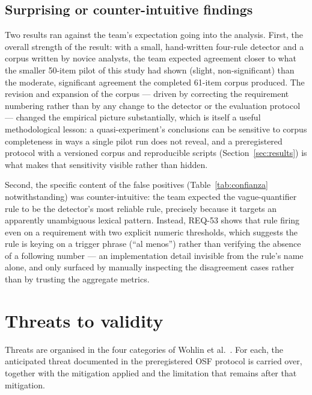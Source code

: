\documentclass[pdflatex,sn-mathphys-num]{sn-jnl}
\theoremstyle{thmstyleone}%
\theoremstyle{thmstyletwo}%
\theoremstyle{thmstylethree}%
\begin{document}
	\subsection{Surprising or counter-intuitive findings}\label{subsec:disc-surprising}
	
	Two results ran against the team's expectation going into the analysis. First,
	the overall strength of the result: with a small, hand-written four-rule
	detector and a corpus written by novice analysts, the team expected agreement
	closer to what the smaller 50-item pilot of this study had shown (slight,
	non-significant) than the moderate, significant agreement the completed
	61-item corpus produced. The revision and expansion of the corpus --- driven by
	correcting the requirement numbering rather than by any change to the detector
	or the evaluation protocol --- changed the empirical picture substantially,
	which is itself a useful methodological lesson: a quasi-experiment's
	conclusions can be sensitive to corpus completeness in ways a single pilot run
	does not reveal, and a preregistered protocol with a versioned corpus and
	reproducible scripts (Section~\ref{sec:results}) is what makes that sensitivity
	visible rather than hidden.
	
	Second, the specific content of the false positives (Table~\ref{tab:confianza}
	notwithstanding) was counter-intuitive: the team expected the vague-quantifier
	rule to be the detector's most reliable rule, precisely because it targets an
	apparently unambiguous lexical pattern. Instead, REQ-53 shows that rule firing
	even on a requirement with two explicit numeric thresholds, which suggests the
	rule is keying on a trigger phrase (``al menos'') rather than verifying the
	absence of a following number --- an implementation detail invisible from the
	rule's name alone, and only surfaced by manually inspecting the disagreement
	cases rather than by trusting the aggregate metrics.
	
	
	\section{Threats to validity}\label{sec:threats}
	
	Threats are organised in the four categories of Wohlin et
	al.~\cite{wohlin2012}. For each, the anticipated threat documented in the
	preregistered OSF protocol is carried over, together with the mitigation
	applied and the limitation that remains after that mitigation.
	
\end{document}
